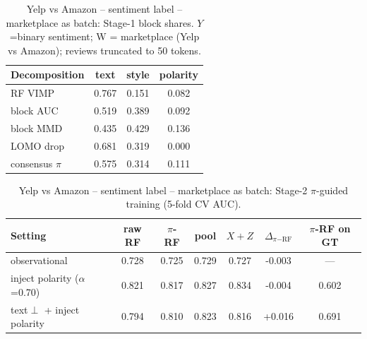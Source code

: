 \begin{table}[t]
\centering
\small
\caption{Yelp vs Amazon  --  sentiment label  --  marketplace as batch: Stage-1 block shares. $Y$=binary sentiment; W = marketplace (Yelp vs Amazon); reviews truncated to 50 tokens.}
\begin{tabular}{lccc}
\toprule
Decomposition & text & style & polarity \\
\midrule
RF VIMP & 0.767 & 0.151 & 0.082 \\
block AUC & 0.519 & 0.389 & 0.092 \\
block MMD & 0.435 & 0.429 & 0.136 \\
LOMO drop & 0.681 & 0.319 & 0.000 \\
consensus $\pi$ & 0.575 & 0.314 & 0.111 \\
\bottomrule
\end{tabular}
\end{table}

\begin{table}[t]
\centering
\small
\caption{Yelp vs Amazon  --  sentiment label  --  marketplace as batch: Stage-2 $\pi$-guided training (5-fold CV AUC).}
\begin{tabular}{lcccccc}
\toprule
Setting & raw RF & $\pi$-RF & pool & $X{+}Z$ & $\Delta_{\pi\mathrm{-RF}}$ & $\pi$-RF on GT \\
\midrule
observational & 0.728 & 0.725 & 0.729 & 0.727 & -0.003 & --- \\
inject polarity ($\alpha$=0.70) & 0.821 & 0.817 & 0.827 & 0.834 & -0.004 & 0.602 \\
text$\perp$ + inject polarity & 0.794 & 0.810 & 0.823 & 0.816 & +0.016 & 0.691 \\
\bottomrule
\end{tabular}
\end{table}

